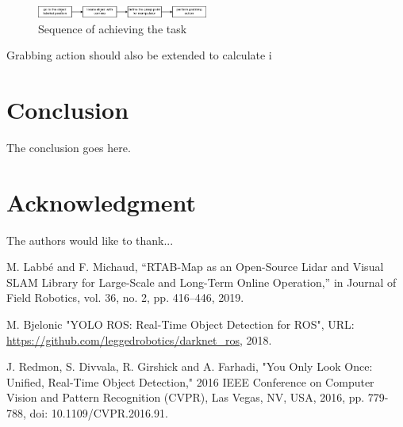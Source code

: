 \documentclass[conference,a4paper]{IEEEtran}
\begin{document}
\begin{figure}[ht]
  \centering
  \includegraphics[width=0.5\textwidth]{img/algorithm_no_problem.png}
  \caption{Sequence of achieving the task}
\end{figure}

Grabbing action should also be extended to calculate i

\section{Conclusion}
The conclusion goes here.

\section*{Acknowledgment}


The authors would like to thank...





%
%
%
\begin{thebibliography}{1}

M. Labbé and F. Michaud, “RTAB-Map as an Open-Source Lidar and Visual SLAM Library for Large-Scale and Long-Term Online Operation,” in Journal of Field Robotics, vol. 36, no. 2, pp. 416–446, 2019. 

M. Bjelonic "YOLO ROS: Real-Time Object Detection for ROS", URL: \url{https://github.com/leggedrobotics/darknet_ros}, 2018.

J. Redmon, S. Divvala, R. Girshick and A. Farhadi, "You Only Look Once: Unified, Real-Time Object Detection," 2016 IEEE Conference on Computer Vision and Pattern Recognition (CVPR), Las Vegas, NV, USA, 2016, pp. 779-788, doi: 10.1109/CVPR.2016.91.

\end{thebibliography}




\end{document}
